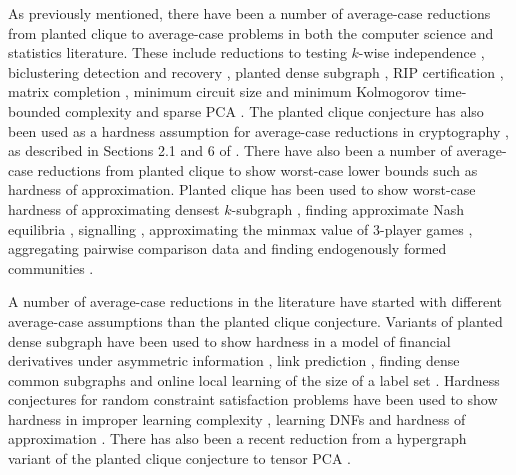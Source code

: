 As previously mentioned, there have been a number of average-case reductions from planted clique to average-case problems in both the computer science and statistics literature. These include reductions to testing $k$-wise independence \cite{alon2007testing}, biclustering detection and recovery \cite{ma2015computational, cai2015computational, caiwu2018}, planted dense subgraph \cite{hajek2015computational}, RIP certification \cite{wang2016average, koiran2014hidden}, matrix completion \cite{chen2015incoherence}, minimum circuit size and minimum Kolmogorov time-bounded complexity \cite{hirahara2017average} and sparse PCA \cite{berthet2013optimal, berthet2013complexity, wang2016statistical, gao2017sparse}. The planted clique conjecture has also been used as a hardness assumption for average-case reductions in cryptography \cite{juels2000hiding, applebaum2010public}, as described in Sections 2.1 and 6 of \cite{Barak2017}. There have also been a number of average-case reductions from planted clique to show worst-case lower bounds such as hardness of approximation. Planted clique has been used to show worst-case hardness of approximating densest $k$-subgraph \cite{alon2011inapproximability}, finding approximate Nash equilibria \cite{minder2009small, hazan2011hard, austrin2013inapproximability}, signalling \cite{dughmi2014hardness, bhaskar2016hardness}, approximating the minmax value of 3-player games \cite{eickmeyer2012approximating}, aggregating pairwise comparison data \cite{shah2016feeling} and finding endogenously formed communities \cite{balcan2013finding}.

A number of average-case reductions in the literature have started with different average-case assumptions than the planted clique conjecture. Variants of planted dense subgraph have been used to show hardness in a model of financial derivatives under asymmetric information \cite{arora2011computational}, link prediction \cite{baldin2018optimal}, finding dense common subgraphs \cite{charikar2018finding} and online local learning of the size of a label set \cite{awasthi2015label}. Hardness conjectures for random constraint satisfaction problems have been used to show hardness in improper learning complexity \cite{daniely2014average}, learning DNFs \cite{daniely2016complexity} and hardness of approximation \cite{feige2002relations}. There has also been a recent reduction from a hypergraph variant of the planted clique conjecture to tensor PCA \cite{zhang2017tensor}.

